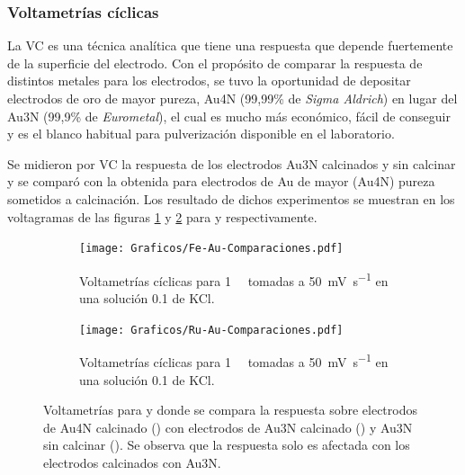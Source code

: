 {		\subsubsection{Voltametrías cíclicas}

			La VC es una técnica analítica que tiene una respuesta que depende fuertemente de la superficie del electrodo.\cite{Wi2000,Pumera2007,Gewirth2004,Villullas2000} Con el propósito de comparar la respuesta de distintos metales para los electrodos, se tuvo la oportunidad de depositar electrodos de oro de mayor pureza, Au4N (99,99\% de \textit{Sigma Aldrich}) en lugar del Au3N (99,9\% de \textit{Eurometal}), el cual es mucho más económico, fácil de conseguir y es el blanco habitual para pulverización disponible en el laboratorio.  

			Se midieron por VC la respuesta de los electrodos Au3N calcinados y sin calcinar y se comparó con la obtenida para electrodos de Au de mayor (Au4N) pureza sometidos a calcinación. Los resultado de dichos experimentos se muestran en los voltagramas de las figuras \ref{fig:Fe-Au-compa} y \ref{fig:Ru-Au-compa} para \aminorutenio\space y \ferroferri\space respectivamente.

				\begin{figure}[ht]
		 	      \begin{subfigure}[t]{0.495\textwidth}
		          	\texttt{[image: Graficos/Fe-Au-Comparaciones.pdf]}
		         	\caption{Voltametrías cíclicas para \fe\space \SI{1}{\milli\Molar} tomadas a \SI{50}{\milli\volt\per\second} en una solución \SI{0.1}{\Molar} de KCl.}
		          	\label{fig:Fe-Au-compa}
		      		\end{subfigure}
		      	 \begin{subfigure}[t]{0.495\textwidth}
		          	\texttt{[image: Graficos/Ru-Au-Comparaciones.pdf]}
		         	\caption{Voltametrías cíclicas para \ru\space \SI{1}{\milli\Molar} tomadas a \SI{50}{\milli\volt\per\second} en una solución \SI{0.1}{\Molar} de KCl.}
		          	\label{fig:Ru-Au-compa}
		      		\end{subfigure}
		      	 \caption[Comparación entre electrodos calcinados y sin calcinar]{Voltametrías para \fe\space y \ru\space donde se compara la respuesta sobre electrodos de Au4N calcinado (\usebox{\oliva}) con electrodos de Au3N calcinado (\usebox{\negro}) y Au3N sin calcinar (\usebox{\rojo}). Se observa que la respuesta solo es afectada con los electrodos calcinados con Au3N.}
		      	 \label{Fig:Comparacion-Au}
	      		 \end{figure}	

}
